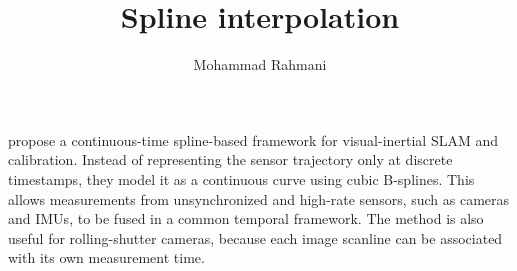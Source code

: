 \documentclass[a4paper]{article}
\title{Spline interpolation}
\date{}
\author{Mohammad Rahmani}
\begin{document}
\maketitle
    
    \cite{lovegrove-2013-spline-fusion-a-continuous-time-representation-for-visual-inertial-fusion-with-application-to-rolling-shutter-cameras} propose a continuous-time spline-based framework for visual-inertial SLAM and calibration. Instead of representing the sensor trajectory only at discrete timestamps, they model it as a continuous curve using cubic B-splines. This allows measurements from unsynchronized and high-rate sensors, such as cameras and IMUs, to be fused in a common temporal framework. The method is also useful for rolling-shutter cameras, because each image scanline can be associated with its own measurement time.





    
    
\end{document}
